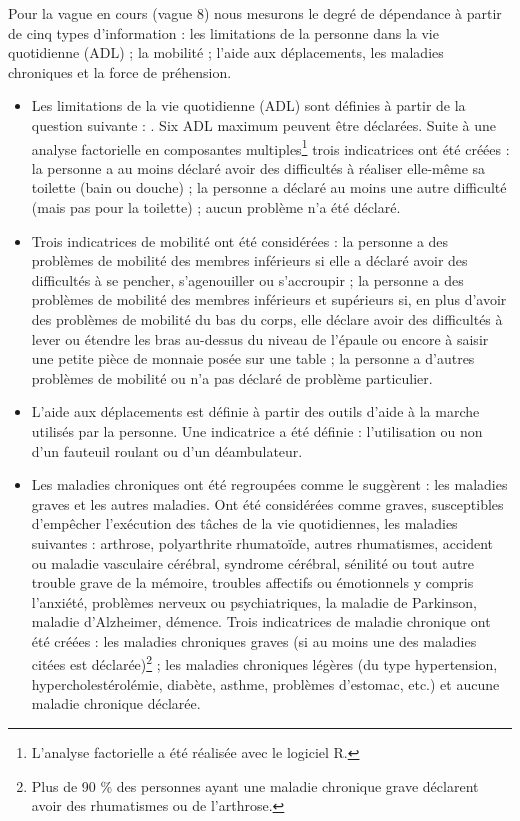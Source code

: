 \begin{Article}
\begin{refsection}[Bonnal]
\noindent Pour la vague en cours (vague 8) nous mesurons le degré de dépendance à partir de cinq types d'information : les limitations de la personne dans la vie quotidienne (ADL) ; la mobilité ; l'aide aux déplacements, les maladies chroniques et la force de préhension.
\begin{itemize}
\item  Les limitations de la vie quotidienne (ADL) sont définies à partir de la question suivante : . Six ADL maximum peuvent être déclarées. Suite à une analyse factorielle en composantes multiples\footnote{L'analyse factorielle a été réalisée avec le logiciel R.} trois indicatrices ont été créées : la personne a au moins déclaré avoir des difficultés à réaliser elle-même sa toilette (bain ou douche) ; la personne a déclaré au moins une autre difficulté (mais pas pour la toilette) ; aucun problème n'a été déclaré.
\item  Trois indicatrices de mobilité ont été considérées : la personne a  des problèmes de mobilité des membres inférieurs si elle a déclaré avoir des difficultés à se pencher, s’agenouiller
ou s’accroupir ; la personne a des problèmes de mobilité des membres inférieurs et supérieurs  
si, en plus d’avoir des problèmes de mobilité du bas du corps, elle déclare avoir des
difficultés à lever ou étendre les bras au-dessus du niveau de l’épaule ou encore à saisir
une petite pièce de monnaie posée sur une table ; la personne a d'autres problèmes de mobilité ou n'a pas déclaré de problème particulier. 
\item  L'aide aux déplacements est définie à partir des outils d'aide à la marche utilisés par la personne. Une indicatrice a été définie : l'utilisation ou non d'un fauteuil roulant ou d'un déambulateur. 
\item  Les maladies chroniques ont été regroupées comme le suggèrent \textcite{KALWIJ2008} : les maladies graves et les autres maladies. Ont été considérées comme graves, susceptibles d'empêcher l'exécution des tâches de la vie quotidiennes, les maladies suivantes : arthrose, polyarthrite rhumatoïde, autres rhumatismes, accident ou maladie vasculaire cérébral, syndrome cérébral, sénilité ou tout autre trouble grave de la mémoire, troubles affectifs ou émotionnels y compris l'anxiété, problèmes nerveux ou psychiatriques, la maladie de Parkinson, maladie d'Alzheimer, démence. Trois indicatrices de maladie chronique ont été créées  : les maladies chroniques graves (si au moins une des maladies citées est déclarée)\footnote{Plus de 90 \% des personnes ayant une maladie chronique grave déclarent avoir des rhumatismes ou de l’arthrose.} ; les maladies chroniques légères (du type hypertension, hypercholestérolémie, diabète, asthme, problèmes d'estomac, etc.) et aucune maladie chronique déclarée.

\end{itemize}
\end{refsection}
\end{Article}
